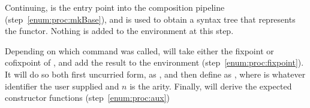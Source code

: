 Continuing,  is the entry point into the composition pipeline (step~\ref{enum:proc:mkBase}), and is used to obtain a syntax tree that represents the  functor.
Nothing is added to the environment at this step.

Depending on which command was called,  will take either the fixpoint or cofixpoint of , and
add the result to the environment (step~\ref{enum:proc:fixpoint}). It will do so both first uncurried form, as , and
then define  as , where  is whatever identifier the
user supplied and $n$ is the arity.
Finally,  will derive the expected constructor functions (step~\ref{enum:proc:aux})


  
  
  
  




